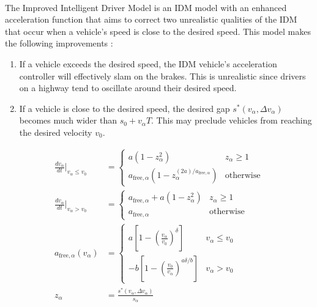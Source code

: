 \documentclass[12pt]{article}
\begin{document}
\paragraph{}
The Improved Intelligent Driver Model is an IDM model with an enhanced acceleration function that aims to correct two unrealistic qualities of the IDM that occur when a vehicle's speed is close to the desired speed. This model makes the following improvements \cite[Chapter~11]{treiber_kesting_2013}:
\begin{enumerate}
  \item
  If a vehicle exceeds the desired speed, the IDM vehicle's acceleration controller will effectively slam on the brakes.  This is unrealistic since drivers on a highway tend to oscillate around their desired speed.
  \item
  If a vehicle is close to the desired speed, the desired gap $s^*(v_\alpha,\Delta v_\alpha)$ becomes much wider than $s_0 + v_\alpha T$.  This may preclude vehicles from reaching the desired velocity $v_0$.
\end{enumerate}
\begin{mymathbox}[ams gather, title=IIDM Governing Functions, colframe=blue!30!black]
  \begin{align}
  \frac{dv_\alpha}{dt}\Bigr|_{v_\alpha\le v_0}&= 
  \begin{cases}
    a (1-z_\alpha^2) & z_\alpha \ge 1\\
   a_{\text{free},\alpha}(1 - z_\alpha^{(2a)/a_{\text{free},\alpha}})& \text{otherwise}
  \end{cases}
  \\
  \frac{dv_\alpha}{dt}\Bigr|_{v_\alpha> v_0}&= 
  \begin{cases}
    a_{\text{free},\alpha} + a (1-z_\alpha^2) & z_\alpha \ge 1\\
    a_{\text{free},\alpha} & \text{otherwise}
  \end{cases}\\
  a_{\text{free},\alpha}(v_\alpha)&= \begin{cases}
  a \left[ 1 - (\frac{v_\alpha}{v_0})^\delta \right] & v_\alpha \le v_0\\
  -b \left[ 1 - (\frac{v_0}{v_\alpha})^{a\delta/b} \right] & v_\alpha > v_0
  \end{cases}\\
  z_\alpha&= \frac{s^*(v_\alpha, \Delta v_\alpha)}{s_\alpha}
  \end{align}
\end{mymathbox}
\end{document}
